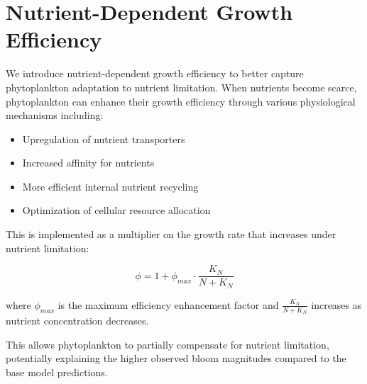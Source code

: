 \section{Nutrient-Dependent Growth Efficiency}

We introduce nutrient-dependent growth efficiency to better capture phytoplankton adaptation to nutrient limitation. When nutrients become scarce, phytoplankton can enhance their growth efficiency through various physiological mechanisms including:

\begin{itemize}
\item Upregulation of nutrient transporters
\item Increased affinity for nutrients
\item More efficient internal nutrient recycling
\item Optimization of cellular resource allocation
\end{itemize}

This is implemented as a multiplier on the growth rate that increases under nutrient limitation:

\[ \phi = 1 + \phi_{max} \cdot \frac{K_N}{N + K_N} \]

where $\phi_{max}$ is the maximum efficiency enhancement factor and $\frac{K_N}{N + K_N}$ increases as nutrient concentration decreases.

This allows phytoplankton to partially compensate for nutrient limitation, potentially explaining the higher observed bloom magnitudes compared to the base model predictions.
